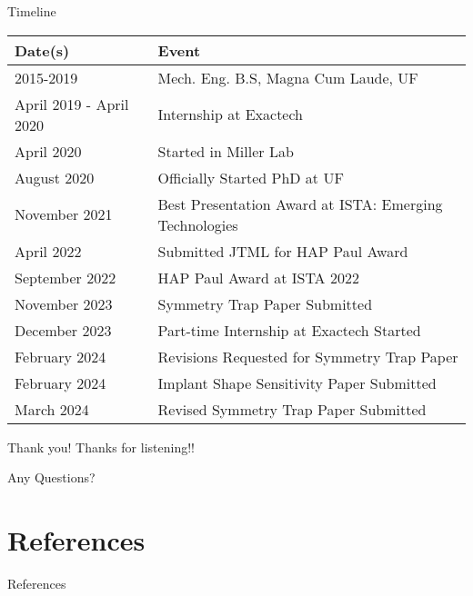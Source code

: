 \documentclass[presentation, aspectratio=1610]{beamer}
\begin{document}
\begin{frame}[label={sec:org7b12f9a}]{Timeline}
\begin{center}
\begin{tabular}{ll}
Date(s) & Event\\
\hline
2015-2019 & Mech. Eng. B.S, Magna Cum Laude, UF\\
April 2019 - April 2020 & Internship at Exactech\\
April 2020 & Started in Miller Lab\\
August 2020 & Officially Started PhD at UF\\
November 2021 & Best Presentation Award at ISTA: Emerging Technologies\\
April 2022 & Submitted JTML for HAP Paul Award\\
September 2022 & HAP Paul Award at ISTA 2022\\
November 2023 & Symmetry Trap Paper Submitted\\
December 2023 & Part-time Internship at Exactech Started\\
February 2024 & Revisions Requested for Symmetry Trap Paper\\
February 2024 & Implant Shape Sensitivity Paper Submitted\\
\hline
March 2024 & Revised Symmetry Trap Paper Submitted\\
\end{tabular}
\end{center}
\end{frame}
\begin{frame}[label={sec:orgacd0c0b}]{Thank you!}
Thanks for listening!!

Any Questions?
\end{frame}
\section{References}
\label{sec:org23ddfc0}
\begin{frame}[label={sec:orgad2184a},fragile, allowframebreaks,  label=]{References}
\printbibliography
\end{frame}
\end{document}
